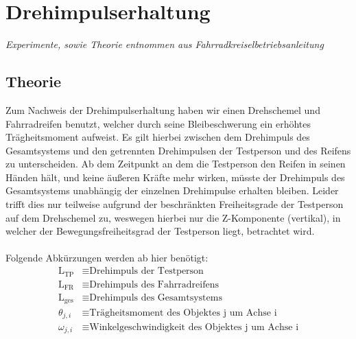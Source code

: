 \documentclass{include/protokollclass}
\begin{document}
    \FrontMatter


    \begingroup \let\clearpage\relax    %
    \tableofcontents                    %
    
    \endgroup



    \MainMatter

    \chapter{Drehimpulserhaltung}\textit{Experimente, sowie Theorie entnommen aus Fahrradkreiselbetriebsanleitung}
    \section{Theorie}
    Zum Nachweis der Drehimpulserhaltung haben wir einen Drehschemel und Fahrradreifen benutzt, welcher durch seine Bleibeschwerung ein erhöhtes Trägheitsmoment aufweist. Es gilt hierbei zwischen dem Drehimpuls des Gesamtsystems und den getrennten Drehimpulsen der Testperson und des Reifens zu unterscheiden. Ab dem Zeitpunkt an dem die Testperson den Reifen in seinen Händen hält, und keine äußeren Kräfte mehr wirken, müsste der Drehimpuls des Gesamtsystems unabhängig der einzelnen Drehimpulse erhalten bleiben. Leider trifft dies nur teilweise aufgrund der beschränkten Freiheitsgrade der Testperson auf dem Drehschemel zu, weswegen hierbei nur die Z-Komponente (vertikal), in welcher der Bewegungsfreiheitsgrad der Testperson liegt, betrachtet wird. \\ \\
    Folgende Abkürzungen werden ab hier benötigt: \\
    \begin{align}
        \mathrm{L_{TP}} &\equiv \text{Drehimpuls\ der\ Testperson} \\
        \mathrm{L_{FR}} &\equiv \text{Drehimpuls\ des\ Fahrradreifens} \\
        \mathrm{L_{ges}} &\equiv \text{Drehimpuls\ des\ Gesamtsystems} \\
        \theta_{j,i} &\equiv \text{Trägheitsmoment\ des\ Objektes\ j\ um\ Achse\ i} \\
        \omega_{j,i} &\equiv \text{Winkelgeschwindigkeit\ des\ Objektes\ j\ um\ Achse\ i}
    \end{align}
    
\end{document}
